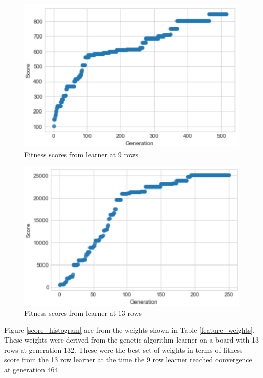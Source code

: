 \documentclass[a4paper,12pt,twocolumn]{article}
\begin{document}
\begin{figure}[h]
    \centering
    \includegraphics[scale=0.5]{9rows_converge.png}
    \caption{Fitness scores from learner at 9 rows}
    \label{score_9rows}
\end{figure}


\begin{figure}[h]
    \centering
    \includegraphics[scale=0.5]{13rows_converge.png}
    \caption{Fitness scores from learner at 13 rows}
    \label{score_13rows}
\end{figure}

Figure \ref{score_histogram} are from the weights shown in Table \ref{feature_weights}.
These weights were derived from the genetic algorithm learner on a board with 13 rows
at generation 132. These were the best set of weights in terms of fitness score from the 13 row learner at the time
the 9 row learner reached convergence at generation 464. 
\end{document}
